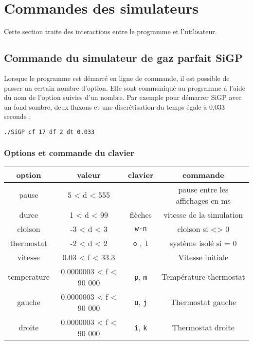 
\section{Commandes des simulateurs}

Cette section traite des interactions entre le programme et l'utilisateur.

\subsection{Commande du simulateur de gaz parfait SiGP}

Lorsque le programme est démarré en ligne de commande, il est possible de passer un certain nombre d'option. Elle sont communiqué au programme à l'aide du nom de l'option suivies d'un nombre. Par exemple pour démarrer SiGP avec un fond sombre, deux fluxons et une discrétisation du temps égale à 0,033 seconde :

\begin{center}
\texttt{./SiGP cf 17 df 2 dt 0.033}
\end{center}

\subsubsection{Options et commande du clavier}

\begin{center}
\begin{tabular}{cccc}
option & valeur & clavier & commande \\
\hline
pause & 5 < d < 555 &  & pause entre les affichages en ms \\
duree & 1 < d < 99 & flèches & vitesse de la simulation \\
cloison & -3 < d < 3 & \texttt{w-n} & cloison si <> 0 \\
thermostat & -2 < d < 2 & \texttt{o} , \texttt{l} & système isolé si = 0 \\
vitesse & 0.03 < f < 33.3 &  & Vitesse initiale \\
temperature & 0.0000003 < f < 90 000 & \texttt{p}, \texttt{m} & Température thermostat \\
gauche & 0.0000003 < f < 90 000 & \texttt{u}, \texttt{j} & Thermostat gauche \\
droite & 0.0000003 < f < 90 000 & \texttt{i}, \texttt{k} & Thermostat droite \\
\end{tabular}
\end{center}

